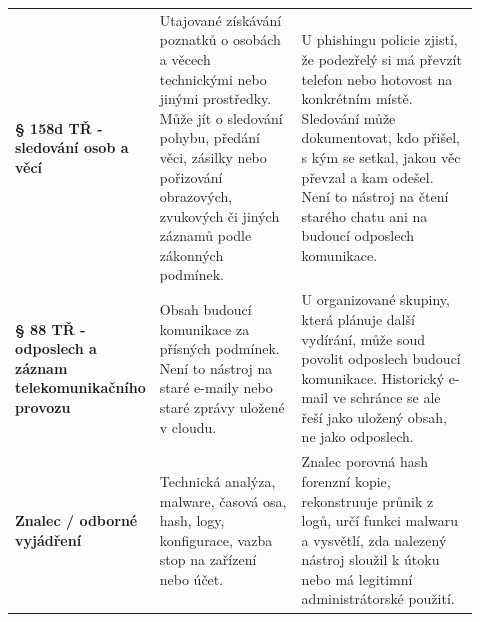 \begin{longtable}{p{0.16\linewidth}p{0.34\linewidth}p{0.42\linewidth}}
\addlinespace
\textbf{§ 158d TŘ - sledování osob a věcí} & Utajované získávání poznatků o osobách a věcech technickými nebo jinými prostředky. Může jít o sledování pohybu, předání věci, zásilky nebo pořizování obrazových, zvukových či jiných záznamů podle zákonných podmínek. & U phishingu policie zjistí, že podezřelý si má převzít telefon nebo hotovost na konkrétním místě. Sledování může dokumentovat, kdo přišel, s kým se setkal, jakou věc převzal a kam odešel. Není to nástroj na čtení starého chatu ani na budoucí odposlech komunikace.\\
\addlinespace
\textbf{§ 88 TŘ - odposlech a záznam telekomunikačního provozu} & Obsah budoucí komunikace za přísných podmínek. Není to nástroj na staré e-maily nebo staré zprávy uložené v cloudu. & U organizované skupiny, která plánuje další vydírání, může soud povolit odposlech budoucí komunikace. Historický e-mail ve schránce se ale řeší jako uložený obsah, ne jako odposlech.\\
\addlinespace
\textbf{Znalec / odborné vyjádření} & Technická analýza, malware, časová osa, hash, logy, konfigurace, vazba stop na zařízení nebo účet. & Znalec porovná hash forenzní kopie, rekonstruuje průnik z logů, určí funkci malwaru a vysvětlí, zda nalezený nástroj sloužil k útoku nebo má legitimní administrátorské použití.\\
\bottomrule
\end{longtable}



